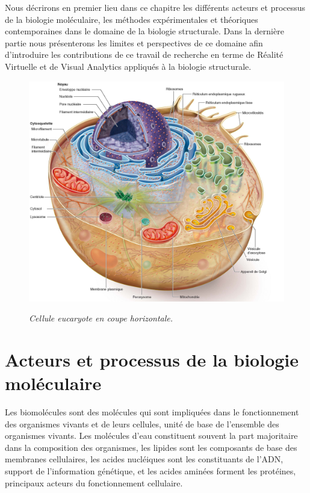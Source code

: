 Nous décrirons en premier lieu dans ce chapitre les différents acteurs et processus de la biologie moléculaire, les méthodes expérimentales et théoriques contemporaines dans le domaine de la biologie structurale. Dans la dernière partie nous présenterons les limites et perspectives de ce domaine afin d'introduire les contributions de ce travail de recherche en terme de Réalité Virtuelle et de Visual Analytics appliqués à la biologie structurale. 

\begin{figure}[h]
  \centering
  {\includegraphics[width=1.00\linewidth]{./figures/ch1/cellule}}
    \caption{\it Cellule eucaryote en coupe horizontale.}
    \label{Fig:cellule}
  \hspace{0.2cm}
\end{figure}

\section{Acteurs et processus de la biologie moléculaire}

Les biomolécules sont des molécules qui sont impliquées dans le fonctionnement des organismes vivants et de leurs cellules, unité de base de l’ensemble des organismes vivants. Les molécules d'eau constituent souvent la part majoritaire dans la composition des organismes, les lipides sont les composants de base des membranes cellulaires, les acides nucléiques sont les constituants de l'ADN, 
support de l'information génétique, et les acides aminées forment les protéines, principaux acteurs du fonctionnement cellulaire.

